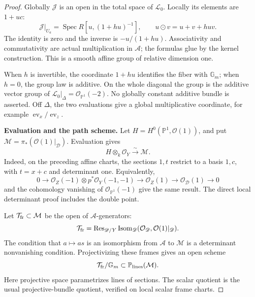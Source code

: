 \begin{proof}
Globally \(\mathcal J\) is an open in the total space
of \(\mathcal L_0\). Locally its elements are \(1+uc\):
\begin{equation}\label{eq:variableQuotientGroupLaw}
 \mathcal J|_{U_a}
   =\operatorname{Spec}R[u,(1+hu)^{-1}],
 \qquad u\odot v=u+v+huv.
\end{equation}
The identity is zero and the inverse is
\(-u/(1+hu)\). Associativity and commutativity
are actual multiplication in \(\mathcal A\);
the formulas glue by the kernel construction.
This is a smooth affine group of relative dimension one.

When \(h\) is invertible, the coordinate \(1+hu\)
identifies the fiber with \(\mathbb G_m\);
when \(h=0\), the group law is additive.
On the whole diagonal the group is the additive
vector group of
\(\mathcal L_0|_\Delta=\mathcal O_{\mathbb P^1}(-2)\).
No globally constant additive bundle is asserted.
Off \(\Delta\), the two evaluations give a global
multiplicative coordinate, for example
\(\operatorname{ev}_x/\operatorname{ev}_z\).

\par\smallskip\noindent\textbf{Evaluation and the path scheme.}\quad
Let \(H=H^0(\mathbb P^1,\mathcal O(1))\), and put
\(\mathcal M=\pi_*(\mathcal O(1)|_{\mathscr D})\).
Evaluation gives
\begin{equation}\label{eq:variableQuotientEvaluation}
                 H\otimes_k\mathcal O_Y
                       \xrightarrow{\sim}\mathcal M.
\end{equation}
Indeed, on the preceding affine charts, the sections
\(1,t\) restrict to a basis \(1,c\), with \(t=x+c\)
and determinant one.
Equivalently,
\[
 0\to\mathcal O_Z(-1)\otimes p^*\mathcal O_Y(-1,-1)
   \to\mathcal O_Z(1)\to\mathcal O_{\mathscr D}(1)\to0
\]
and the cohomology vanishing of \(\mathcal O_{\mathbb P^1}(-1)\)
give the same result.
The direct local determinant proof includes the double point.

Let \(\mathcal T_{\rm fr}\subset\mathcal M\) be the
open of \(\mathcal A\)-generators:
\[
 \mathcal T_{\rm fr}
  =\operatorname{Res}_{\mathscr D/Y}
       \operatorname{Isom}_{\mathscr D}
       (\mathcal O_{\mathscr D},\mathcal O(1)|_{\mathscr D}).
\]
The condition that \(a\mapsto as\) is an isomorphism
from \(\mathcal A\) to \(\mathcal M\) is a determinant
nonvanishing condition.
Projectivizing these frames gives an open scheme
\[
 \mathcal T_{\rm fr}/\mathbb G_m
       \subset\mathbb P_{\rm lines}(\mathcal M).
\]
Here projective space parametrizes lines of sections.
The scalar quotient is the usual projective-bundle
quotient, verified on local scalar frame charts.


\end{proof}
